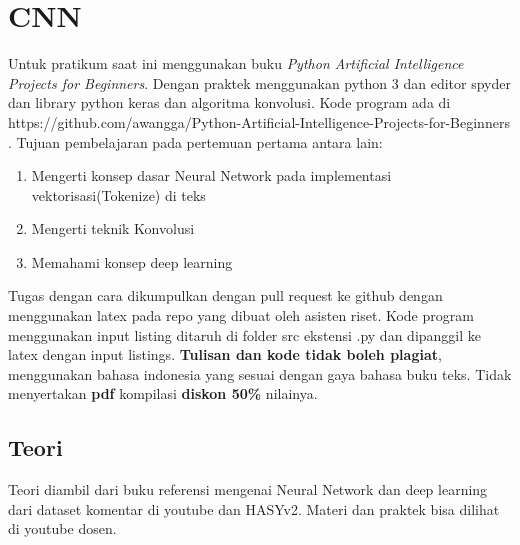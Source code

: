 \chapter{CNN}

Untuk pratikum saat ini menggunakan buku \textit{Python Artificial Intelligence Projects for Beginners}\cite{eckroth2018python}. Dengan praktek menggunakan python 3 dan editor spyder dan library python keras dan algoritma konvolusi.
Kode program ada di https://github.com/awangga/Python-Artificial-Intelligence-Projects-for-Beginners .
Tujuan pembelajaran pada pertemuan pertama antara lain:
\begin{enumerate}
\item
Mengerti konsep dasar Neural Network pada implementasi vektorisasi(Tokenize) di teks
\item
Mengerti teknik Konvolusi
\item
Memahami konsep deep learning
\end{enumerate}

Tugas dengan cara dikumpulkan dengan pull request ke github dengan menggunakan latex pada repo yang dibuat oleh asisten riset. Kode program menggunakan input listing ditaruh di folder src ekstensi .py dan dipanggil ke latex dengan input listings. \textbf{Tulisan dan kode tidak boleh plagiat}, menggunakan bahasa indonesia yang sesuai dengan gaya bahasa buku teks. Tidak menyertakan \textbf{pdf} kompilasi \textbf{diskon 50\%} nilainya.

\section{Teori}
Teori diambil dari buku referensi mengenai Neural Network dan deep learning dari dataset komentar di youtube dan HASYv2. Materi dan praktek bisa dilihat di youtube dosen.


